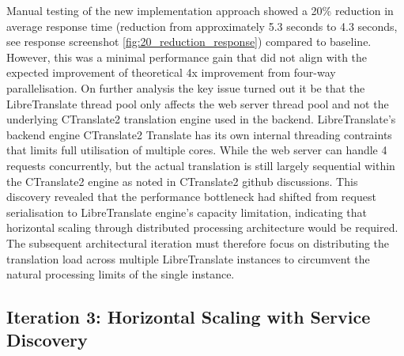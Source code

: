 Manual testing of the new implementation approach showed a 20\% reduction in average response time (reduction from approximately 5.3 seconds to 4.3 seconds, see response screenshot \ref{fig:20_reduction_response}) compared to baseline. However, this was a minimal performance gain that did not align with the expected improvement of theoretical 4x improvement from four-way parallelisation. On further analysis the key issue turned out it be that the LibreTranslate thread pool only affects the web server thread pool and not the underlying CTranslate2 translation engine used in the backend. LibreTranslate's backend engine CTranslate2 Translate has its own internal threading contraints that limits full utilisation of multiple cores\cite{euno2023unable}. While the web server can handle 4 requests concurrently, but the actual translation is still largely sequential within the CTranslate2 engine as noted in CTranslate2 github discussions\cite{hobodrifterdavid}. This discovery revealed that the performance bottleneck had shifted from request serialisation to LibreTranslate engine's capacity limitation, indicating that horizontal scaling through distributed processing architecture would be required. The subsequent architectural iteration must therefore focus on distributing the translation load across multiple LibreTranslate instances to circumvent the natural processing limits of the single instance.

\subsection{Iteration 3: Horizontal Scaling with Service Discovery}

